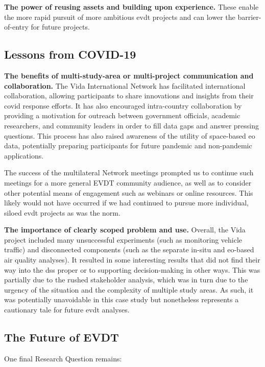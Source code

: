 \textbf{The power of reusing assets and building upon experience.} These enable the more rapid pursuit of more ambitious \ac{evdt} projects and can lower the barrier-of-entry for future projects.

\subsection{Lessons from COVID-19}

\textbf{The benefits of multi-study-area or multi-project communication and collaboration.} The Vida International Network has facilitated international collaboration, allowing participants to share innovations and insights from their \ac{covid} response efforts. It has also encouraged intra-country collaboration by providing a motivation for outreach between government officials, academic researchers, and community leaders in order to fill data gaps and answer pressing questions. This process has also raised awareness of the utility of space-based \ac{eo} data, potentially preparing participants for future pandemic and non-pandemic applications. 

The success of the multilateral Network meetings prompted us to continue such meetings for a more general EVDT community audience, as well as to consider other potential means of engagement such as webinars or online resources. This likely would not have occurred if we had continued to pursue more individual, siloed \ac{evdt} projects as was the norm.

\textbf{The importance of clearly scoped problem and use.} Overall, the Vida project included many unsuccessful experiments (such as monitoring vehicle traffic) and disconnected components (such as the separate in-situ and \ac{eo}-based air quality analyses). It resulted in some interesting results that did not find their way into the \ac{dss} proper or to supporting decision-making in other ways. This was partially due to the rushed stakeholder analysis, which was in turn due to the urgency of the situation and the complexity of multiple study areas. As such, it was potentially unavoidable in this case study but nonetheless represents a cautionary tale for future \ac{evdt} analyses.

\subsection{The Future of EVDT} \label{sec:future}

One final Research Question remains:

